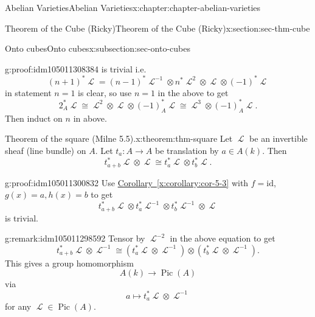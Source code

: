 \documentclass[oneside,10pt,]{book}
\numberwithin{equation}{section}
\newcommand{\sheaf}[1]{\operatorname{\mathcal{#1}}}
\newcommand{\id}{\mathrm{id}}
\DeclareMathOperator{\Pic}{Pic}
\begin{document}
\begin{chapterptx}{Abelian Varieties}{}{Abelian Varieties}{}{}{x:chapter:chapter-abelian-varieties}
\begin{sectionptx}{Theorem of the Cube (Ricky)}{}{Theorem of the Cube (Ricky)}{}{}{x:section:sec-thm-cube}
\begin{subsectionptx}{Onto cubes}{}{Onto cubes}{}{}{x:subsection:sec-onto-cubes}
\begin{proofptx}{}{g:proof:idm105011308384}
is trivial i.e.%
\begin{equation*}
(n+1)^*\sheaf L =  (n-1)^*\sheaf L^{-1}\otimes n^*\sheaf L^2 \otimes   \sheaf L \otimes   (-1)^*\sheaf L
\end{equation*}
in statement \(n = 1\) is clear, so use \(n=1\) in the above to get%
\begin{equation*}
2_A^*\sheaf L \cong \sheaf L^2 \otimes \sheaf L \otimes (-1)^*_A \sheaf L\cong \sheaf L^3 \otimes (-1)_A^*\sheaf  L\text{.}
\end{equation*}
Then induct on \(n\) in above.%
\end{proofptx}
\begin{theorem}{Theorem of the square (Milne 5.5).}{}{x:theorem:thm-square}%
Let \(\sheaf L\) be an invertible sheaf (line bundle) on \(A\). Let \(t_a \colon A\to A\) be translation by \(a\in A(k)\). Then%
\begin{equation*}
t_{a+b}^*\sheaf L \otimes \sheaf L \cong t_a^*\sheaf L \otimes t_b^* \sheaf L\text{.}
\end{equation*}
%
\end{theorem}
\begin{proofptx}{}{g:proof:idm105011300832}
Use \hyperref[x:corollary:cor-5-3]{Corollary~\ref{x:corollary:cor-5-3}} with \(f=  \id\), \(g(x)  = a, h(x) = b\) to get%
\begin{equation*}
t_{a+b}^*\sheaf L \otimes t_{a}^*\sheaf L ^{-1}\otimes t_b^* \sheaf L ^{-1} \otimes \sheaf L
\end{equation*}
is trivial.%
\end{proofptx}
\begin{remark}{}{g:remark:idm105011298592}%
Tensor by \(\sheaf L^{-2}\) in the above equation to get%
\begin{equation*}
t_{a+b}^*\sheaf L \otimes\sheaf L^{-1} \cong ( t_{a}^*\sheaf L \otimes \sheaf L^{-1}) \otimes(t_b^* \sheaf L\otimes \sheaf L^{-1})\text{.}
\end{equation*}
This gives a group homomorphism%
\begin{equation*}
A(k) \to \Pic(A)
\end{equation*}
via%
\begin{equation*}
a\mapsto t_a^*\sheaf L \otimes \sheaf L^{-1}
\end{equation*}
for any \(\sheaf L \in \Pic(A)\).%
\end{remark}
\end{subsectionptx}
\end{sectionptx}
%
%
\typeout{************************************************}

\end{chapterptx}
\end{document}
